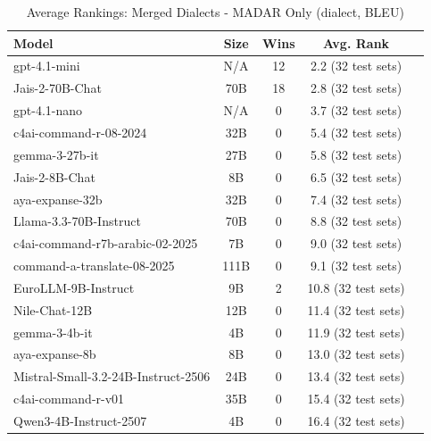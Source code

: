 \begin{table}[htbp]
\centering
\caption{Average Rankings: Merged Dialects - MADAR Only (dialect, BLEU)}
\label{tab:avg_rankings_bleu_dialect}
\begin{tabular}{l@{\hspace{3pt}}c@{\hspace{3pt}}c@{\hspace{3pt}}c@{\hspace{3pt}}c}
\toprule
Model & Size & Wins & Avg. Rank \\
\midrule
gpt-4.1-mini & N/A & 12 & 2.2 (32 test sets) \\
Jais-2-70B-Chat & 70B & 18 & 2.8 (32 test sets) \\
gpt-4.1-nano & N/A & 0 & 3.7 (32 test sets) \\
c4ai-command-r-08-2024 & 32B & 0 & 5.4 (32 test sets) \\
gemma-3-27b-it & 27B & 0 & 5.8 (32 test sets) \\
Jais-2-8B-Chat & 8B & 0 & 6.5 (32 test sets) \\
aya-expanse-32b & 32B & 0 & 7.4 (32 test sets) \\
Llama-3.3-70B-Instruct & 70B & 0 & 8.8 (32 test sets) \\
c4ai-command-r7b-arabic-02-2025 & 7B & 0 & 9.0 (32 test sets) \\
command-a-translate-08-2025 & 111B & 0 & 9.1 (32 test sets) \\
EuroLLM-9B-Instruct & 9B & 2 & 10.8 (32 test sets) \\
Nile-Chat-12B & 12B & 0 & 11.4 (32 test sets) \\
gemma-3-4b-it & 4B & 0 & 11.9 (32 test sets) \\
aya-expanse-8b & 8B & 0 & 13.0 (32 test sets) \\
Mistral-Small-3.2-24B-Instruct-2506 & 24B & 0 & 13.4 (32 test sets) \\
c4ai-command-r-v01 & 35B & 0 & 15.4 (32 test sets) \\
Qwen3-4B-Instruct-2507 & 4B & 0 & 16.4 (32 test sets) \\
\bottomrule
\end{tabular}
\end{table}